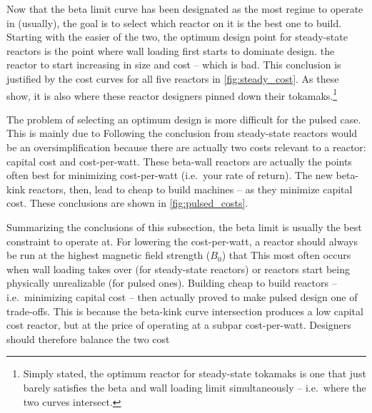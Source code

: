 Now that the beta limit curve has been designated as the most  regime to operate in (usually), the goal is to select which reactor on it is the best one to build. Starting with the easier of the two, the optimum design point for steady-state reactors is the point where wall loading first starts to dominate  design.  the reactor to start increasing in size and cost -- which is bad. This conclusion is justified by the cost curves for all five reactors in \cref{fig:steady_cost}. As these show, it is also where these reactor designers pinned down their tokamaks.\footnote{ Simply stated, the optimum reactor for steady-state tokamaks is one that just barely satisfies the beta and wall loading limit simultaneously -- i.e.\ where the two curves intersect. }

The problem of selecting an optimum design is more difficult for the pulsed case. This is mainly due to  Following the conclusion from steady-state reactors would be an oversimplification because there are actually two costs relevant to a reactor: capital cost and cost-per-watt. These beta-wall reactors are actually the points often best for minimizing cost-per-watt (i.e.\ your rate of return). The new beta-kink reactors, then, lead to cheap to build machines -- as they minimize capital cost. These conclusions are shown in \cref{fig:pulsed_costs}.

Summarizing the conclusions of this subsection, the beta limit is usually the best constraint to operate at. For lowering the cost-per-watt, a reactor should always be run at the highest magnetic field strength ($B_0$) that  This most often occurs when wall loading takes over (for steady-state reactors) or reactors start being physically unrealizable (for pulsed ones). Building cheap to build reactors -- i.e.\ minimizing capital cost -- then actually proved to make pulsed design one of trade-offs. This is because the beta-kink curve intersection produces a low capital cost reactor, but at the price of operating at a subpar cost-per-watt. Designers should therefore balance the two cost 

\clearpage

